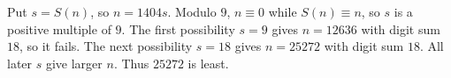 Put $s=S(n)$, so $n=1404s$. Modulo $9$, $n\equiv0$ while $S(n)\equiv n$, so $s$ is a positive multiple of $9$. The first possibility $s=9$ gives $n=12636$ with digit sum $18$, so it fails. The next possibility $s=18$ gives $n=25272$ with digit sum $18$. All later $s$ give larger $n$. Thus $\boxed{25272}$ is least.
